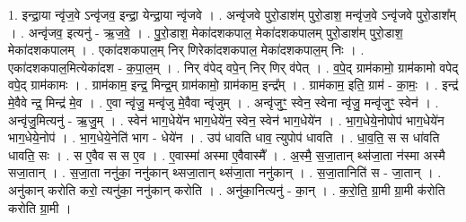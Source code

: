 \documentclass[17pt]{extarticle}
\begin{document}
1. इन्द्रा॒या न्वृ॑ज॒वे ऽन्वृ॑जव॒ इन्द्रा॒ येन्द्रा॒या न्वृ॑जवे । . अन्वृ॑जवे पुरो॒डाश॑म् पुरो॒डाश॒ मन्वृ॑ज॒वे ऽन्वृ॑जवे पुरो॒डाश᳚म् । . अन्वृ॑जव॒ इत्यनु॑ - ऋ॒ज॒वे॒ । . पु॒रो॒डाश॒ मेका॑दशकपाल॒ मेका॑दशकपालम् पुरो॒डाश॑म् पुरो॒डाश॒ मेका॑दशकपालम् । . एका॑दशकपाल॒म् निर् णिरेका॑दशकपाल॒ मेका॑दशकपाल॒म् निः । . एका॑दशकपाल॒मित्येका॑दश - क॒पा॒ल॒म् । . निर् व॑पेद् वपे॒न् निर् णिर् व॑पेत् । . व॒पे॒द् ग्राम॑कामो॒ ग्राम॑कामो वपेद् वपे॒द् ग्राम॑कामः । . ग्राम॑काम॒ इन्द्र॒ मिन्द्र॒म् ग्राम॑कामो॒ ग्राम॑काम॒ इन्द्र᳚म् । . ग्राम॑काम॒ इति॒ ग्राम॑ - का॒मः॒ । . इन्द्र॑ मे॒वैवे न्द्र॒ मिन्द्र॑ मे॒व । . ए॒वा न्वृ॑जु॒ मन्वृ॑जु मे॒वैवा न्वृ॑जुम् । . अन्वृ॑जुꣳ॒॒ स्वेन॒ स्वेना न्वृ॑जु॒ मन्वृ॑जुꣳ॒॒ स्वेन॑ । . अन्वृ॑जु॒मित्यनु॑ - ऋ॒जु॒म् । . स्वेन॑ भाग॒धेये॑न भाग॒धेये॑न॒ स्वेन॒ स्वेन॑ भाग॒धेये॑न । . भा॒ग॒धेये॒नोपोप॑ भाग॒धेये॑न भाग॒धेये॒नोप॑ । . भा॒ग॒धेये॒नेति॑ भाग - धेये॑न । . उप॑ धावति धाव॒ त्युपोप॑ धावति । . धा॒व॒ति॒ स स धा॑वति धावति॒ सः । . स ए॒वैव स स ए॒व । . ए॒वास्मा॑ अस्मा ए॒वैवास्मै᳚ । . अ॒स्मै॒ स॒जा॒तान् थ्स॑जा॒ता न॑स्मा अस्मै सजा॒तान् । . स॒जा॒ता ननु॑का॒ ननु॑कान् थ्सजा॒तान् थ्स॑जा॒ता ननु॑कान् । . स॒जा॒तानिति॑ स - जा॒तान् । . अनु॑कान् करोति करो॒ त्यनु॑का॒ ननु॑कान् करोति । . अनु॑का॒नित्यनु॑ - का॒न् । . क॒रो॒ति॒ ग्रा॒मी ग्रा॒मी क॑रोति करोति ग्रा॒मी । \newline
\end{document}
